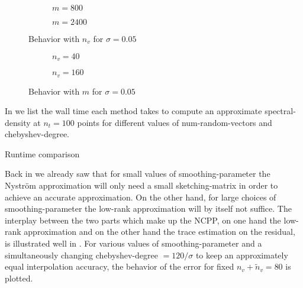 \begin{figure}[ht]
    \begin{subfigure}[b]{0.45\columnwidth}
        
        \caption{$m=800$}
        \label{fig:5-experiments-electronic-structure-convergence-nv-m800}
    \end{subfigure}
    \begin{subfigure}[b]{0.5\columnwidth}
        
        \caption{$m=2400$}
        \label{fig:5-experiments-electronic-structure-convergence-nv-m2400}
    \end{subfigure}
    \caption{Behavior with $n_v$ for $\sigma=0.05$}
    \label{fig:5-experiments-electronic-structure-convergence-nv}
\end{figure}

\begin{figure}[ht]
    \centering
    \begin{subfigure}[b]{0.45\columnwidth}
        
        \caption{$n_v=40$}
        \label{fig:5-experiments-electronic-structure-convergence-m-nv40}
    \end{subfigure}
    \begin{subfigure}[b]{0.5\columnwidth}
        
        \caption{$n_v=160$}
        \label{fig:5-experiments-electronic-structure-convergence-m-nv160}
    \end{subfigure}
    \caption{Behavior with $m$ for $\sigma=0.05$}
    \label{fig:5-experiments-electronic-structure-convergence-m}
\end{figure}

In  we list the wall time each method
takes to compute an approximate \gls{spectral-density} at $n_t=100$ points
for different values of \gls{num-random-vectors} and \gls{chebyshev-degree}.

\begin{table}[ht]
    \caption{Runtime comparison}
    \label{tab:5-experiments-timing-DGC}
    
\end{table}

Back in  we already saw that for small values of \gls{smoothing-parameter}
the Nystr\"om approximation will only need a small \gls{sketching-matrix} in order
to achieve an accurate approximation. On the other hand, for large choices of
\gls{smoothing-parameter} the low-rank approximation will by itself not suffice.
The interplay between the two parts which make up the \gls{NCPP},
on one hand the low-rank approximation and on the other hand the
trace estimation on the residual, is illustrated well in
.
For various values of \gls{smoothing-parameter} and a simultaneously changing
\gls{chebyshev-degree} $=120 / \sigma$ to keep an approximately equal interpolation
accuracy, the behavior of the error for fixed $n_v + \widetilde{n}_v = 80$ is plotted.

